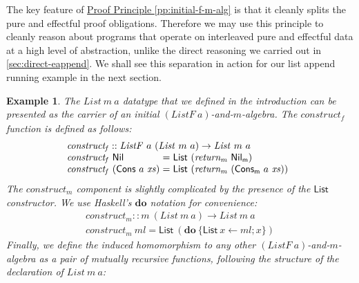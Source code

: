 \documentclass{jfp1}
\newtheorem{example}{Example}
\newcommand{\proofprinref}[1]{\hyperref[#1]{Proof Principle \ref*{#1}}}
\newcommand{\kw}[1]{\textbf{#1}}
\begin{document}
The key feature of \proofprinref{pp:initial-f-m-alg} is that it
cleanly splits the pure and effectful proof obligations. Therefore we
may use this principle to cleanly reason about programs that operate
on interleaved pure and effectful data at a high level of abstraction,
unlike the direct reasoning we carried out in
\autoref{sec:direct-eappend}. We shall see this separation in action
for our list append running example in the next section.

\begin{example}
  The $\mathit{List}~m~a$ datatype that we defined in the introduction
  can be presented as the carrier of an initial
  $(\mathit{ListF}~a)$-and-$m$-algebra. The $\mathit{construct_f}$
  function is defined as follows:
  \begin{displaymath}
    \begin{array}{l}
      \mathit{construct_f} :: \mathit{ListF}~a~(\mathit{List}~m~a) \to \mathit{List}~m~a \\
      \begin{array}{@{}l@{\hspace{0.3em}}c@{\hspace{0.3em}}l}
        \mathit{construct_f}~\mathsf{Nil}&=&\mathsf{List}~(\mathit{return_m}~\mathsf{Nil_m}) \\
        \mathit{construct_f}~(\mathsf{Cons}~a~\mathit{xs})&=&\mathsf{List}~(\mathit{return_m}~(\mathsf{Cons_m}~a~\mathit{xs})) \\
      \end{array}
    \end{array}
  \end{displaymath}
  The $\mathit{construct_m}$ component is slightly complicated by the
  presence of the $\mathsf{List}$ constructor. We use Haskell's
  $\kw{do}$ notation for convenience:
  \begin{displaymath}
    \begin{array}{l}
      \mathit{construct_m} :: m~(\mathit{List}~m~a) \to \mathit{List}~m~a \\
      \mathit{construct_m}~\mathit{ml} = \mathsf{List}~(\kw{do}~\{ \mathsf{List}~x \leftarrow \mathit{ml}; x \})
    \end{array}
  \end{displaymath}
  Finally, we define the induced homomorphism to any other
  $(\mathit{ListF}~a)$-and-$m$-algebra as a pair of mutually recursive
  functions, following the structure of the declaration of
  $\mathit{List}~m~a$:
  \begin{displaymath}
    \begin{array}{l}

\end{array}
\end{displaymath}
\end{example}
\end{document}

